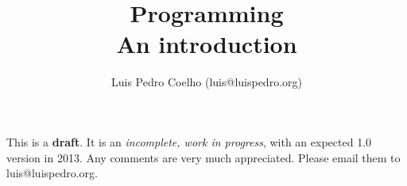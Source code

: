 \documentclass[article,letterpaper,twoside]{memoir}
\title{Programming\\An introduction}
\author{Luis Pedro Coelho (luis@luispedro.org)}
\begin{document}
\maketitle

{\large
This is a \textbf{draft}. It is an \emph{incomplete, work in progress}, with an
expected 1.0 version in 2013. Any comments are very much appreciated. Please
email them to luis@luispedro.org.
}




\end{document}
